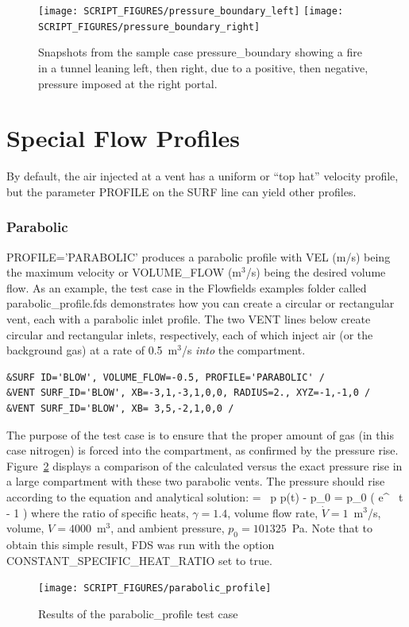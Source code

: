 \documentclass[11pt]{book}
\begin{document}
\begin{figure}[ht]
\texttt{[image: SCRIPT\_FIGURES/pressure\_boundary\_left]}
\texttt{[image: SCRIPT\_FIGURES/pressure\_boundary\_right]}
\caption[Snapshots of the {\ct pressure\_boundary} test case]{Snapshots from the sample case {\ct pressure\_boundary}
showing a fire in a tunnel leaning left, then right, due to a positive, then negative, pressure imposed at
the right portal.}
\label{pressure_boundary}
\end{figure}



\section{Special Flow Profiles}
\label{info:profiles}

By default, the air injected at a vent has a uniform or ``top hat'' velocity profile, but the parameter {\ct PROFILE} on the {\ct SURF} line can yield other profiles.

\subsubsection{Parabolic}
\label{parabolic_profile}

{\ct PROFILE='PARABOLIC'} produces a parabolic profile with {\ct VEL} (m/s) being the maximum velocity or {\ct VOLUME\_FLOW} (m$^3$/s) being the desired volume flow. As an example, the test case in the {\ct Flowfields} examples folder called {\ct parabolic\_profile.fds} demonstrates how you can create a circular or rectangular vent, each with a parabolic inlet profile. The two {\ct VENT} lines below create circular and rectangular inlets, respectively, each of which inject air (or the background gas) at a rate of 0.5~m$^3$/s {\em into} the compartment.
\begin{lstlisting}
&SURF ID='BLOW', VOLUME_FLOW=-0.5, PROFILE='PARABOLIC' /
&VENT SURF_ID='BLOW', XB=-3,1,-3,1,0,0, RADIUS=2., XYZ=-1,-1,0 /
&VENT SURF_ID='BLOW', XB= 3,5,-2,1,0,0 /
\end{lstlisting}
The purpose of the test case is to ensure that the proper amount of gas (in this case nitrogen) is forced into the compartment, as confirmed by the pressure rise. Figure~\ref{parabolic_profile_fig} displays a comparison of the calculated versus the exact pressure rise in a large compartment with these two parabolic vents. The pressure should rise according to the equation and analytical solution:
\be
    =  \, p   \quad \Longrightarrow \quad p(t) - p_0 = p_0 \left( {\rm e}^{ \, t} - 1 \right)
\ee
where the ratio of specific heats, $\gamma=1.4$, volume flow rate, $\dot{V}=1$~m$^3$/s, volume, $V=4000$~m$^3$, and ambient pressure, $p_0=101325$~Pa. Note that to obtain this simple result, FDS was run with the option {\ct CONSTANT\_SPECIFIC\_HEAT\_RATIO} set to true.
\begin{figure}[ht]
\centering
\texttt{[image: SCRIPT\_FIGURES/parabolic\_profile]}
\caption[Results of the {\ct parabolic\_profile} test case]{Results of the {\ct parabolic\_profile} test case}
\label{parabolic_profile_fig}
\end{figure}
\end{document}
